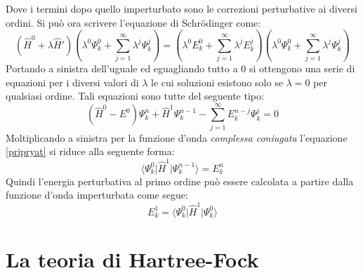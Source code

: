 \documentclass[oneside]{amsbook}
\numberwithin{section}{chapter}
\numberwithin{equation}{section}
\numberwithin{figure}{section}
\begin{document}
Dove i termini dopo quello imperturbato sono le correzioni perturbative ai diversi ordini.
Si può ora scrivere l'equazione di Schr\"odinger come:
\begin{equation}
\left(\hat{H}^0+\lambda\hat{H}'\right)\left(\lambda^0\Psi_k^0+\sum \limits
_{j=1}^{\infty} \lambda^j\Psi_k^j\right)=\left(\lambda^0E_k^0+\sum \limits
_{j=1}^{\infty} \lambda^jE_k^j\right)\left(\lambda^0\Psi_k^0+\sum \limits
_{j=1}^{\infty} \lambda^j\Psi_k^j\right)
\end{equation}
Portando a sinistra dell'uguale ed eguagliando tutto a $0$ si ottengono una serie di equazioni per i diversi valori di $\lambda$ le cui soluzioni esistono solo se $\lambda=0$ per qualsiasi ordine. Tali equazioni sono tutte del seguente tipo:
\begin{equation}
\label{pripryat}
\left(\hat{H}^0-E^0\right)\Psi_k^n+\hat{H}^1\Psi_k^{n-1}-\sum \limits
_{j=1}^{\infty}E_k^{n-j}\Psi_k^j=0
\end{equation}
Moltiplicando a sinistra per la funzione d'onda \emph{complessa coniugata} l'equazione \ref{pripryat} si riduce alla seguente forma:
\begin{equation}
\langle\Psi_k^0\vert\hat{H}^1\vert\Psi_k^{n-1}\rangle=E_k^n
\end{equation}
Quindi l'energia perturbativa al primo ordine può essere calcolata a partire dalla funzione d'onda imperturbata come segue:
\begin{equation}
E_k^1=\langle\Psi_k^0\vert\hat{H}^1\vert\Psi_k^{0}\rangle
\end{equation}
\section{La teoria di Hartree-Fock}
\end{document}
